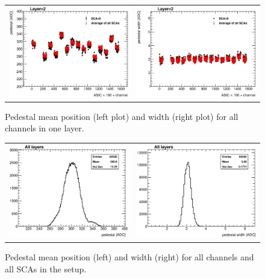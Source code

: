 \documentclass[a4paper,11pt]{article}
\begin{document}
\begin{figure}[!t]
  \centering
  \begin{tabular}{ll}
    \includegraphics[width=2.8in]{../figs/pedestal/ped_mean_layer2.eps} & \includegraphics[width=2.8in]{../figs/pedestal/width_mean_layer2.eps}
  \end{tabular}
  \caption{Pedestal mean position (left plot) and width (right plot) for all channels in one layer.}
\label{pedestal_layer}
\end{figure}

\begin{figure}[!t]
  \centering
  \begin{tabular}{ll}
    \includegraphics[width=2.8in]{../figs/pedestal/h_ped_mean.eps} & \includegraphics[width=2.8in]{../figs/pedestal/h_ped_width.eps}
  \end{tabular}
  \caption{Pedestal mean position (left) and width (right) for all channels and all SCAs in the setup.}
\label{pedestal_all}
\end{figure}
\end{document}
